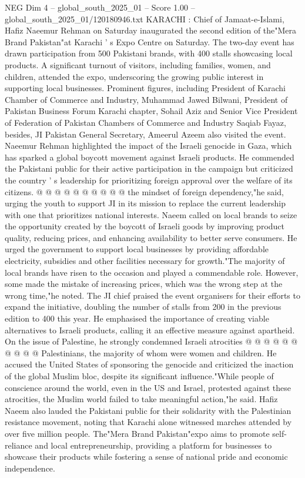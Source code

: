 \begin{textsample}{NEG Dim 4 – global\_south\_2025\_01 – Score 1.00 – global\_south\_2025\_01/120180946.txt}  \label{ex:f4_neg_443}
KARACHI : Chief of Jamaat-e-Islami, Hafiz Naeemur Rehman on Saturday inaugurated the second edition of the"Mera Brand Pakistan"at Karachi ' s Expo Centre on Saturday.
The two-day event has drawn participation from 500 Pakistani brands, with 400 stalls showcasing local products.
A significant turnout of visitors, including families, women, and children, attended the expo, underscoring the growing public interest in supporting local businesses.
Prominent figures, including President of Karachi Chamber of Commerce and Industry, Muhammad Jawed Bilwani, President of Pakistan Business Forum Karachi chapter, Sohail Aziz and Senior Vice President of Federation of Pakistan Chambers of Commerce and Industry Saqiab Fayaz, besides, JI Pakistan General Secretary, Ameerul Azeem also visited the event.
Naeemur Rehman highlighted the impact of the Israeli genocide in Gaza, which has sparked a global boycott movement against Israeli products.
He commended the Pakistani public for their active participation in the campaign but criticized the country ' s leadership for prioritizing foreign approval over the welfare of its citizens. @ @ @ @ @ @ @ @ @ @ the mindset of foreign dependency,"he said, urging the youth to support JI in its mission to replace the current leadership with one that prioritizes national interests.
Naeem called on local brands to seize the opportunity created by the boycott of Israeli goods by improving product quality, reducing prices, and enhancing availability to better serve consumers.
He urged the government to support local businesses by providing affordable electricity, subsidies and other facilities necessary for growth."The majority of local brands have risen to the occasion and played a commendable role.
However, some made the mistake of increasing prices, which was the wrong step at the wrong time,"he noted.
The JI chief praised the event organisers for their efforts to expand the initiative, doubling the number of stalls from 200 in the previous edition to 400 this year.
He emphasised the importance of creating viable alternatives to Israeli products, calling it an effective measure against apartheid.
On the issue of Palestine, he strongly condemned Israeli atrocities @ @ @ @ @ @ @ @ @ @ Palestinians, the majority of whom were women and children.
He accused the United States of sponsoring the genocide and criticized the inaction of the global Muslim bloc, despite its significant influence."While people of conscience around the world, even in the US and Israel, protested against these atrocities, the Muslim world failed to take meaningful action,"he said.
Hafiz Naeem also lauded the Pakistani public for their solidarity with the Palestinian resistance movement, noting that Karachi alone witnessed marches attended by over five million people.
The"Mera Brand Pakistan"expo aims to promote self-reliance and local entrepreneurship, providing a platform for businesses to showcase their products while fostering a sense of national pride and economic independence.

\end{textsample}
